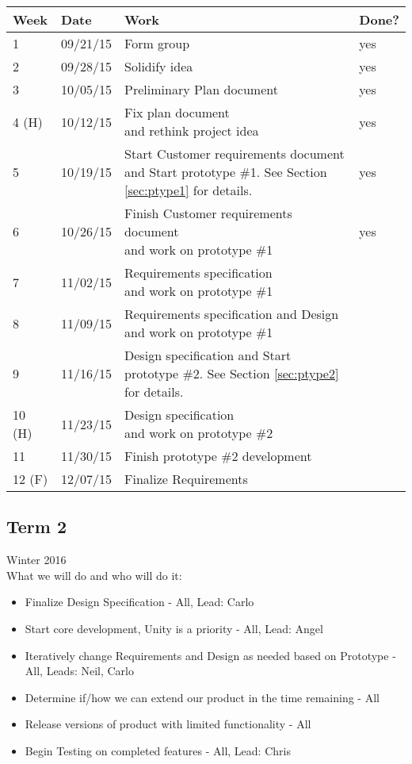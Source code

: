\begin{table}[H]
\centering
\begin{tabular}{|l|l|l|l|}
\hline
Week 	& Date	 		& Work	 		& 	Done?	 \\ \hline
1		& 09/21/15	 	& Form group		& 	yes		 \\ \hline
2		& 09/28/15	 	& Solidify idea	& 	yes		 \\ \hline
3		& 10/05/15	 	& Preliminary Plan document	& 	yes		 \\ \hline
4 (H)	& 10/12/15	 	& \specialcell{Fix plan document \\ and rethink project idea}	& 			yes \\ \hline
5		& 10/19/15	 	& \specialcell{Start Customer requirements document \\ and Start prototype \#1. See Section \ref{sec:ptype1} for details.}		& 	yes		 \\ \hline
6		& 10/26/15	 	& \specialcell{Finish Customer requirements document \\ and work on prototype \#1}		& 	yes		 \\ \hline	
7		& 11/02/15	 	& \specialcell{Requirements specification \\ and work on prototype \#1} & 			 \\ \hline
8		& 11/09/15	 	& \specialcell{Requirements specification and Design \\and work on prototype \#1}		& 			 \\ \hline
9		& 11/16/15	 	& \specialcell{Design specification and Start \\ prototype \#2. See Section \ref{sec:ptype2} for details.}		& 			 \\ \hline
10 (H)	& 11/23/15	 	& \specialcell{Design specification \\ and work on prototype \#2}		& 			 \\ \hline
11		& 11/30/15	 	& Finish prototype \#2 development	& 			 \\ \hline
12 (F)	& 12/07/15	 	& Finalize Requirements		& 			 \\ \hline
\end{tabular}
\end{table}

\subsection{Term 2}
Winter 2016 \\
What we will do and who will do it:
\begin{itemize}
	\item Finalize Design Specification - All, Lead: Carlo
	\item Start core development, Unity is a priority - All, Lead: Angel
	\item Iteratively change Requirements and Design as needed based on Prototype - All, Leads: Neil, Carlo
	\item Determine if/how we can extend our product in the time remaining - All
	\item Release versions of product with limited functionality - All
	\item Begin Testing on completed features - All, Lead: Chris
\end{itemize}

